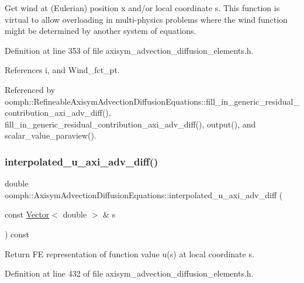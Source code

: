 Get wind at (Eulerian) position x and/or local coordinate s. This function is virtual to allow overloading in multi-\/physics problems where the wind function might be determined by another system of equations. 



Definition at line 353 of file axisym\+\_\+advection\+\_\+diffusion\+\_\+elements.\+h.



References i, and Wind\+\_\+fct\+\_\+pt.



Referenced by oomph\+::\+Refineable\+Axisym\+Advection\+Diffusion\+Equations\+::fill\+\_\+in\+\_\+generic\+\_\+residual\+\_\+contribution\+\_\+axi\+\_\+adv\+\_\+diff(), fill\+\_\+in\+\_\+generic\+\_\+residual\+\_\+contribution\+\_\+axi\+\_\+adv\+\_\+diff(), output(), and scalar\+\_\+value\+\_\+paraview().

\mbox{\label{classoomph_1_1AxisymAdvectionDiffusionEquations_a91e4ff18062a265f7ed265902914e15a}} 
\subsubsection{\texorpdfstring{interpolated\+\_\+u\+\_\+axi\+\_\+adv\+\_\+diff()}{interpolated\_u\_axi\_adv\_diff()}}
{\footnotesize\ttfamily double oomph\+::\+Axisym\+Advection\+Diffusion\+Equations\+::interpolated\+\_\+u\+\_\+axi\+\_\+adv\+\_\+diff (\begin{DoxyParamCaption}\item[{const \hyperlink{classoomph_1_1Vector}{Vector}$<$ double $>$ \&}]{s }\end{DoxyParamCaption}) const\hspace{0.3cm}{\ttfamily [inline]}}



Return FE representation of function value u(s) at local coordinate s. 



Definition at line 432 of file axisym\+\_\+advection\+\_\+diffusion\+\_\+elements.\+h.



